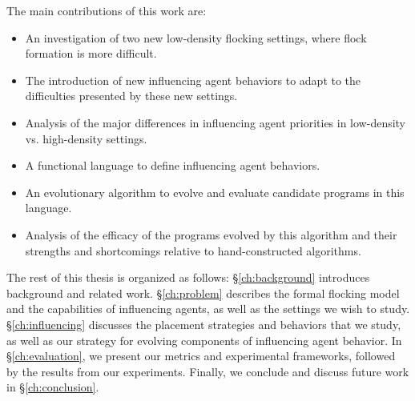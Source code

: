 The main contributions of this work are:
\begin{itemize}
    \item An investigation of two new low-density flocking settings, where
    flock formation is more difficult.
    \item The introduction of new influencing agent behaviors to adapt to the
    difficulties presented by these new settings.
    \item Analysis of the major differences in influencing agent priorities in
    low-density vs. high-density settings.
    \item A functional language to define influencing agent behaviors.
    \item An evolutionary algorithm to evolve and evaluate candidate programs
    in this language.
    \item Analysis of the efficacy of the programs evolved by this algorithm
    and their strengths and shortcomings relative to hand-constructed
    algorithms.
\end{itemize}

The rest of this thesis is organized as follows: \S\ref{ch:background}
introduces background and related work.
\S\ref{ch:problem} describes the formal flocking model and the capabilities of
influencing agents, as well as the settings we wish to study.
\S\ref{ch:influencing} discusses the placement strategies and behaviors that we
study, as well as our strategy for evolving components of influencing agent
behavior.
In \S\ref{ch:evaluation}, we present our metrics and experimental frameworks,
followed by the results from our experiments.
Finally, we conclude and discuss future work in \S\ref{ch:conclusion}.

